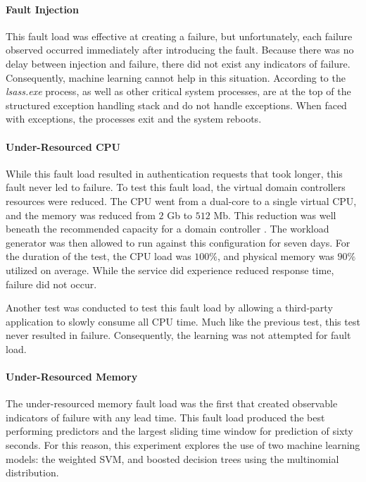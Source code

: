 \paragraph{Fault Injection}
This fault load was effective at creating a failure, but unfortunately, each
failure observed occurred immediately after introducing the fault.  Because
there was no delay between injection and failure, there did not exist any
indicators of failure.  Consequently, machine learning cannot help in this
situation.  According to \citet{russinovich2009} the
\emph{lsass.exe} process, as well as other critical system processes, are at
the top of the structured exception handling stack and do not handle
exceptions.  When faced with exceptions, the processes exit and the system
reboots.

\paragraph{Under-Resourced \ac{CPU}}
While this fault load resulted in authentication requests that took longer,
this fault never led to failure.  To test this fault load, the virtual domain
controllers resources were reduced.  The \ac{CPU} went from a dual-core to a
single virtual CPU, and the memory was reduced from $2$ Gb to $512$ Mb.  This
reduction was well beneath the recommended capacity for a domain controller
\citep{mak12}.  The workload generator was then allowed to run against this
configuration for seven days.  For the duration of the test, the \ac{CPU} load
was $100\%$, and physical memory was $90\%$ utilized on average.  While the
service did experience reduced response time, failure did not occur.

Another test was conducted to test this fault load by allowing a third-party
application to slowly consume all \ac{CPU} time.  Much like the previous test,
this test never resulted in failure.  Consequently, the learning was not
attempted for fault load.

\paragraph{Under-Resourced Memory}
The under-resourced memory fault load was the first that created observable
indicators of failure with any lead time.  This fault load produced the best
performing predictors and the largest sliding time window for prediction of
sixty seconds.  For this reason, this experiment explores the use of two
machine learning models: the weighted \ac{SVM}, and boosted decision trees
using the multinomial distribution.  

